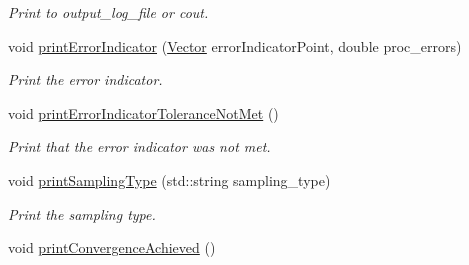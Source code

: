 \begin{DoxyCompactItemize}
\begin{DoxyCompactList}\small\item\em Print to output\-\_\-log\-\_\-file or cout. \end{DoxyCompactList}\item 
void \hyperlink{class_c_a_r_o_m_1_1_greedy_parameter_point_sampler_a8addf658e0b98dfa363c4194ada115d8}{print\-Error\-Indicator} (\hyperlink{class_c_a_r_o_m_1_1_vector}{Vector} error\-Indicator\-Point, double proc\-\_\-errors)
\begin{DoxyCompactList}\small\item\em Print the error indicator. \end{DoxyCompactList}\item 
\hypertarget{class_c_a_r_o_m_1_1_greedy_parameter_point_sampler_afe559c2472c106b9e83f49ab5ceef134}{void \hyperlink{class_c_a_r_o_m_1_1_greedy_parameter_point_sampler_afe559c2472c106b9e83f49ab5ceef134}{print\-Error\-Indicator\-Tolerance\-Not\-Met} ()}\label{class_c_a_r_o_m_1_1_greedy_parameter_point_sampler_afe559c2472c106b9e83f49ab5ceef134}

\begin{DoxyCompactList}\small\item\em Print that the error indicator was not met. \end{DoxyCompactList}\item 
void \hyperlink{class_c_a_r_o_m_1_1_greedy_parameter_point_sampler_ac9d8c4a38e0075cb19048ffd48c7b4a9}{print\-Sampling\-Type} (std\-::string sampling\-\_\-type)
\begin{DoxyCompactList}\small\item\em Print the sampling type. \end{DoxyCompactList}\item 
\hypertarget{class_c_a_r_o_m_1_1_greedy_parameter_point_sampler_a80a682a8075faef22c99ed4c1edfc400}{void \hyperlink{class_c_a_r_o_m_1_1_greedy_parameter_point_sampler_a80a682a8075faef22c99ed4c1edfc400}{print\-Convergence\-Achieved} ()}\label{class_c_a_r_o_m_1_1_greedy_parameter_point_sampler_a80a682a8075faef22c99ed4c1edfc400}


\end{DoxyCompactItemize}
